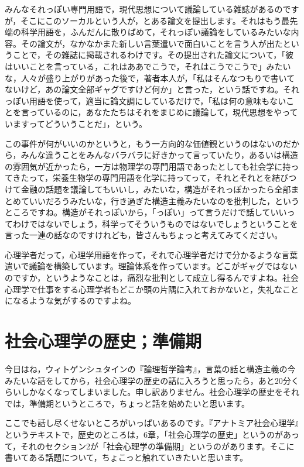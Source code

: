 \documentclass{ltjsbook}
\begin{document}
みんなそれっぽい専門用語で，現代思想について議論している雑誌があるのですが，そこにこのソーカルという人が，とある論文を提出します。それはもう最先端の科学用語を，ふんだんに散りばめて，それっぽい議論をしているみたいな内容。その論文が，なかなかまた新しい言葉遣いで面白いことを言う人が出たということで，その雑誌に掲載されるわけです。その提出された論文について，「彼はいいことを言っている，これはああでこうで，それはこうでこうで」みたいな，人々が盛り上がりがあった後で，著者本人が，「私はそんなつもりで書いてないけど，あの論文全部ギャグですけど何か」と言った，という話ですね。それっぽい用語を使って，適当に論文調にしているだけで，「私は何の意味もないことを言っているのに，あなたたちはそれをまじめに議論して，現代思想をやっていますってどういうことだ」，という。

この事件が何がいいのかというと，もう一方向的な価値観というのはないのだから，みんな違うことをみんなバラバラに好きかって言っていたり，あるいは構造の雰囲気が近かったら，一方は物理学の専門用語であったとしても社会学に持ってきたって，栄養生物学の専門用語を化学に持ってって，それとそれとを結びつけて金融の話題を議論してもいいし，みたいな，構造がそれっぽかったら全部まとめていいだろうみたいな，行き過ぎた構造主義みたいなのを批判した，というところですね。構造がそれっぽいから，「っぽい」って言うだけで話していいってわけではないでしょう，科学ってそういうものではないでしょうということを言った一連の話なのですけれども，皆さんもちょっと考えてみてください。

心理学者だって，心理学用語を作って，それで心理学者だけで分かるような言葉遣いで議論を構築しています。理論体系を作っています。どこがギャグではないのですか，というようなことは，痛烈な批判として成立し得るんですよね。社会心理学で仕事をする心理学者もどこか頭の片隅に入れておかないと，失礼なことになるような気がするのですよね。

\section{社会心理学の歴史；準備期}
今日はね，ウィトゲンシュタインの『論理哲学論考』，言葉の話と構造主義の今みたいな話をしてから，社会心理学の歴史の話に入ろうと思ったら，あと20分くらいしかなくなってしまいました。申し訳ありません。社会心理学の歴史をそれでは，準備期というところで，ちょっと話を始めたいと思います。

ここでも話し尽くせないところがいっぱいあるのです。『アナトミア社会心理学』というテキストで，歴史のところは，6章，「社会心理学の歴史」というのがあって，それのセクション2が「社会心理学の準備期」というのがあります。そこに書いてある話題について，ちょこっと触れていきたいと思います。
\end{document}
